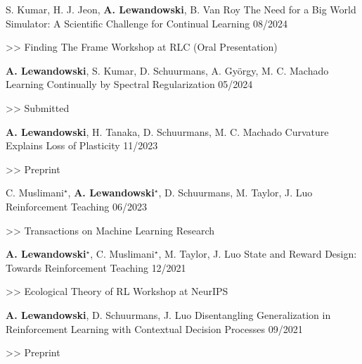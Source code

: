 \begin{cventries}

    \cventry
    {S. Kumar, H. J. Jeon, \textbf{A. Lewandowski}, B. Van Roy}
    {The Need for a Big World Simulator: A Scientific Challenge for Continual Learning}
    {08/2024}
    {
      \begin{cvitems}
    	\item[>>] Finding The Frame Workshop at RLC (Oral Presentation)
      \end{cvitems}
    }

    \cventry
    {\textbf{A. Lewandowski}, S. Kumar, D. Schuurmans, A. György, M. C. Machado}
    {Learning Continually by Spectral Regularization}
    {05/2024}
    {
      \begin{cvitems}
    	\item[>>] Submitted
      \end{cvitems}
    }

    \cventry
    {\textbf{A. Lewandowski}, H. Tanaka, D. Schuurmans, M. C. Machado}
    {Curvature Explains Loss of Plasticity}
    {11/2023}
    {
      \begin{cvitems}
    	\item[>>] Preprint
      \end{cvitems}
    }

    \cventry
    {C. Muslimani$^{\star}$, \textbf{A. Lewandowski}$^\star$, D. Schuurmans, M. Taylor, J. Luo}
    {Reinforcement Teaching}
    {06/2023}
    {
      \begin{cvitems}
    	\item[>>] Transactions on Machine Learning Research
      \end{cvitems}
    }

    \cventry
    {\textbf{A. Lewandowski}$^\star$, C. Muslimani$^{\star}$, M. Taylor, J. Luo}
    {State and Reward Design: Towards Reinforcement Teaching}
    {12/2021}
    {
      \begin{cvitems}
        \item[>>] Ecological Theory of RL Workshop at NeurIPS
      \end{cvitems}
    }

    \cventry
    {\textbf{A. Lewandowski}, D. Schuurmans, J. Luo}
    {Disentangling Generalization in Reinforcement Learning with Contextual
      Decision Processes}
    {09/2021}
    {
      \begin{cvitems}
    	\item[>>] Preprint
      \end{cvitems}
    }


\end{cventries}
